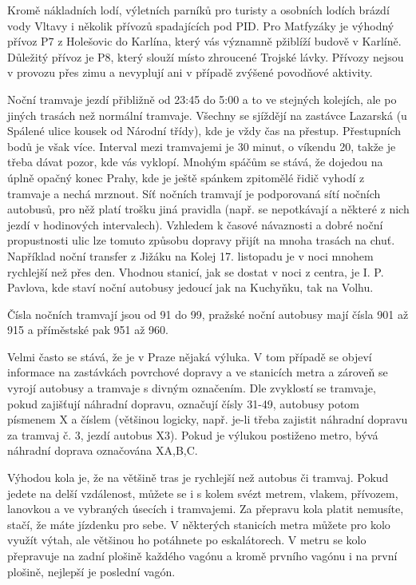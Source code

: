 Kromě nákladních lodí, výletních parníků pro turisty a osobních lodích brázdí vody Vltavy i
několik přívozů spadajících pod PID. Pro Matfyzáky je výhodný přívoz P7 z Holešovic do Karlína, který vás významně pžiblíží budově v Karlíně. Důležitý přívoz je P8, který slouží místo zhroucené Trojské lávky. Přívozy nejsou v provozu přes zimu a nevyplují ani v případě
zvýšené povodňové aktivity. 

Noční tramvaje jezdí přibližně od 23:45 do 5:00 a to ve stejných kolejích, ale
po jiných trasách než normální tramvaje. Všechny se sjíždějí na zastávce
Lazarská (u Spálené ulice kousek od Národní třídy), kde je vždy čas na přestup.
Přestupních bodů je však více. Interval mezi tramvajemi
je 30 minut, o víkendu 20, takže je třeba dávat pozor, kde vás vyklopí. Mnohým
spáčům se stává, že dojedou na úplně opačný konec Prahy, kde je ještě spánkem
zpitomělé řidič vyhodí z tramvaje a nechá mrznout. Síť nočních tramvají je
podporovaná sítí nočních autobusů, pro něž platí trošku jiná pravidla (např. se
nepotkávají a některé z nich jezdí v hodinových intervalech). Vzhledem k časové
návaznosti a dobré noční propustnosti ulic lze tomuto způsobu dopravy přijít na
mnoha trasách na chuť. Například noční transfer z Jižáku na Kolej 17. listopadu
je v noci mnohem rychlejší než přes den. Vhodnou stanicí, jak se dostat v noci z
centra, je I. P. Pavlova, kde staví noční autobusy jedoucí jak na Kuchyňku, tak
na Volhu.

Čísla nočních tramvají jsou od 91 do 99, pražské noční autobusy mají čísla 901
až 915 a příměstské pak 951 až 960.

Velmi často se stává, že je v Praze nějaká výluka. V tom případě se objeví
informace na zastávkách povrchové dopravy a ve stanicích metra a zároveň se
vyrojí autobusy a tramvaje s divným označením. Dle zvyklostí se tramvaje, pokud
zajišťují náhradní dopravu, označují čísly 31-49, autobusy potom písmenem X a
číslem (většinou logicky, např. je-li třeba zajistit náhradní dopravu za tramvaj
č. 3, jezdí autobus X3). Pokud je výlukou postiženo metro, bývá náhradní doprava
označována X{A,B,C}. 

Výhodou kola je, že na většině tras je rychlejší než autobus či tramvaj. Pokud
jedete na delší vzdálenost, můžete se i s kolem svézt metrem, vlakem, přívozem,
lanovkou a ve vybraných úsecích i tramvajemi. Za přepravu kola platit nemusíte,
stačí, že máte jízdenku pro sebe. V některých stanicích metra můžete pro kolo
využít výtah, ale většinou ho potáhnete po eskalátorech. V metru se kolo
přepravuje na zadní plošině každého vagónu a kromě prvního vagónu i na první
plošině, nejlepší je poslední vagón.


